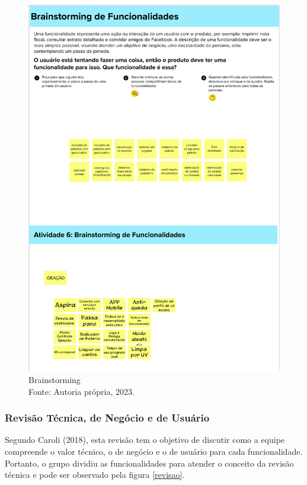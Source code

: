 \begin{figure}[H]
\centering
\includegraphics[height=0.7\textheight]{figuras/Lean Inception/Mural - Brainstorm.png}
\caption{Brainstorming \\ Fonte: Autoria própria, 2023.}

\label{Brainstorming}
\end{figure}
 

\subsubsection{Revisão Técnica, de Negócio e de Usuário}
Segundo Caroli (2018), esta revisão tem o objetivo de discutir como a equipe compreende o valor técnico, o de negócio e o de usuário para cada funcionalidade. Portanto, o grupo dividiu as funcionalidades para atender o conceito da revisão técnica e pode ser observado pela figura \ref{revisao}.

